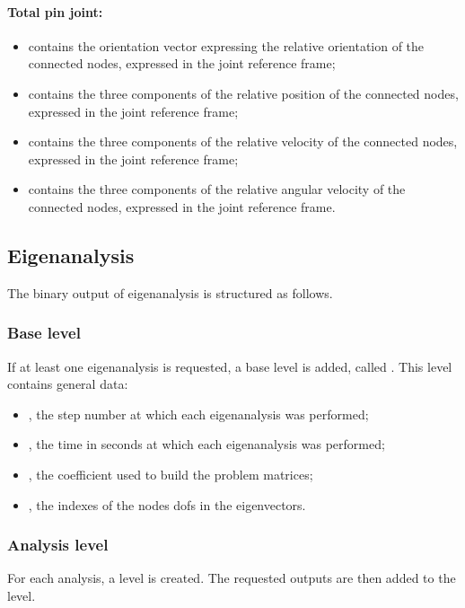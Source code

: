 \paragraph{Total pin joint:}
\begin{itemize}
\item {} contains the orientation vector
  expressing the relative orientation of the connected nodes, expressed in 
  the joint reference frame;
\item {} contains the three components of
  the relative position of the connected nodes, expressed in the joint 
  reference frame;
\item {} contains the three components of
  the relative velocity of the connected nodes, expressed in the joint 
  reference frame;
\item {} contains the three components
  of the relative angular velocity of the connected nodes, expressed in 
  the joint reference frame.
\end{itemize}


\subsection{Eigenanalysis}
\label{sec:NetCDF:Eigen}
The binary output of eigenanalysis is structured as follows.
\subsubsection{Base level}
If at least one eigenanalysis is requested, a base level is added, called .
This level contains general data:
\begin{itemize}
\item {}, the step number at which each eigenanalysis was performed;
\item {}, the time in seconds at which each eigenanalysis was performed;
\item {}, the coefficient used to build the problem matrices;
\item {}, the indexes of the nodes dofs in the eigenvectors.
\end{itemize}

\subsubsection{Analysis level}
For each analysis, a level  is created. The requested outputs 
are then added to the level.

